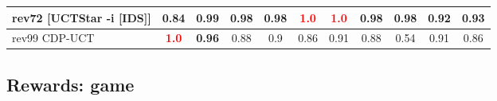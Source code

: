\documentclass{article}
\begin{document}
\begin{tabular}{|l|r@{$\pm$}rr@{$\pm$}rr@{$\pm$}rr@{$\pm$}rr@{$\pm$}rr@{$\pm$}rr@{$\pm$}rr@{$\pm$}rr@{$\pm$}rr@{$\pm$}r|}
rev72 [UCTStar -i [IDS]]
& \multicolumn{2}{c}{0.84}
& \multicolumn{2}{c}{0.99}
& \multicolumn{2}{c}{0.98}
& \multicolumn{2}{c}{0.98}
& \multicolumn{2}{c}{\textbf{\textcolor{red}{1.0}}}
& \multicolumn{2}{c}{\textbf{\textcolor{red}{1.0}}}
& \multicolumn{2}{c}{0.98}
& \multicolumn{2}{c}{0.98}
& \multicolumn{2}{c}{0.92}
& \multicolumn{2}{c|}{0.93}
\\
\hline
rev99 CDP-UCT
& \multicolumn{2}{c}{\textbf{\textcolor{red}{1.0}}}
& \multicolumn{2}{c}{\textbf{0.96}}
& \multicolumn{2}{c}{0.88}
& \multicolumn{2}{c}{0.9}
& \multicolumn{2}{c}{0.86}
& \multicolumn{2}{c}{0.91}
& \multicolumn{2}{c}{0.88}
& \multicolumn{2}{c}{0.54}
& \multicolumn{2}{c}{0.91}
& \multicolumn{2}{c|}{0.86}
\\
\hline
\end{tabular}%

\bigskip

\subsection*{Rewards: game}
\end{document}
